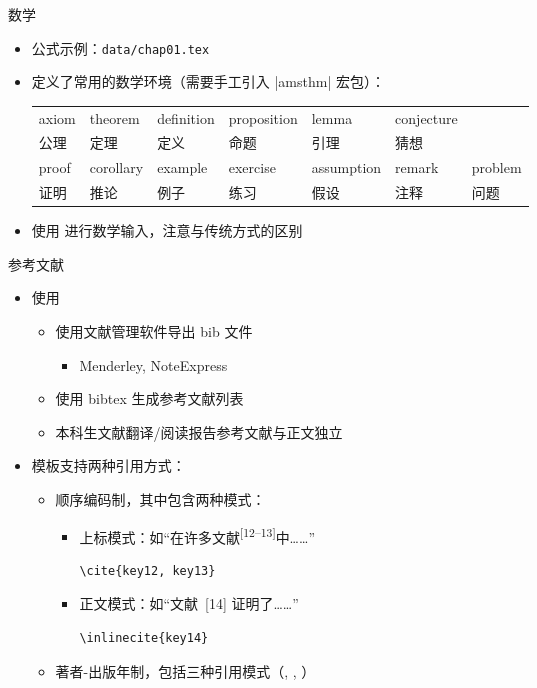 \begin{frame}[fragile]{数学}
  \begin{itemize}
    \item 公式示例：\nolinkurl{data/chap01.tex}
    \item \ThuThesis{} 定义了常用的数学环境（需要手工引入 |amsthm| 宏包）：
      \begin{table}[h]
        \centering
\begin{tabular}{*{7}{l}}\toprule
  axiom & theorem & definition & proposition & lemma & conjecture &\\
  公理 & 定理 & 定义 & 命题 & 引理 & 猜想 &\\\midrule
  proof & corollary & example & exercise & assumption & remark & problem \\
  证明 & 推论 & 例子& 练习 & 假设 & 注释 & 问题\\\bottomrule
\end{tabular}
      \end{table}
      \item \ThuThesis{} 使用  进行数学输入，注意与传统方式的区别
  \end{itemize}
\end{frame}

\begin{frame}[fragile]{参考文献}
  \begin{itemize}
    \item 使用 \BibTeX
      \begin{itemize}
        \item 使用文献管理软件导出 bib 文件
          \begin{itemize}
            \item Menderley, NoteExpress
          \end{itemize}
        \item 使用 bibtex 生成参考文献列表
        \item 本科生文献翻译/阅读报告参考文献与正文独立
      \end{itemize}
    \item 模板支持两种引用方式：
      \begin{itemize}
        \item 顺序编码制，其中包含两种模式：
        \begin{itemize}
          \item 上标模式：如``在许多文献\textsuperscript{[12--13]}中……''
          \begin{lstlisting}[basicstyle=\ttfamily]
    \cite{key12, key13}
          \end{lstlisting}
        \item 正文模式：如``文献~[14] 证明了……''
          \begin{lstlisting}[basicstyle=\ttfamily]
    \inlinecite{key14}
          \end{lstlisting}
        \end{itemize}
        \item 著者-出版年制，包括三种引用模式（, , ）
      \end{itemize}
    \end{itemize}
\end{frame}


